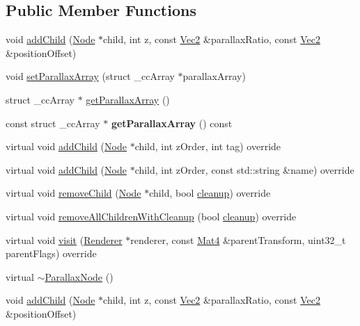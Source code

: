 \subsection*{Public Member Functions}
\begin{DoxyCompactItemize}
\item 
void \hyperlink{classParallaxNode_a6801f18148da7e535e00539086e7661c}{add\+Child} (\hyperlink{classNode}{Node} $\ast$child, int z, const \hyperlink{classVec2}{Vec2} \&parallax\+Ratio, const \hyperlink{classVec2}{Vec2} \&position\+Offset)
\item 
void \hyperlink{classParallaxNode_a6aa28ef360af7ce78e07ef0633da5396}{set\+Parallax\+Array} (struct \+\_\+cc\+Array $\ast$parallax\+Array)
\item 
struct \+\_\+cc\+Array $\ast$ \hyperlink{classParallaxNode_a38cffa76b86e590c2ed9e3b307ea5ee1}{get\+Parallax\+Array} ()
\item 
\mbox{\label{classParallaxNode_a4d3e87281892a340c62aa0df86bc3989}} 
const struct \+\_\+cc\+Array $\ast$ {\bfseries get\+Parallax\+Array} () const
\item 
virtual void \hyperlink{classParallaxNode_ad6094cbe40bd10724b586e136edfed4b}{add\+Child} (\hyperlink{classNode}{Node} $\ast$child, int z\+Order, int tag) override
\item 
virtual void \hyperlink{classParallaxNode_a2ebcf0d5cf1050020272bae8c76641ed}{add\+Child} (\hyperlink{classNode}{Node} $\ast$child, int z\+Order, const std\+::string \&name) override
\item 
virtual void \hyperlink{classParallaxNode_ae7a8f0dc0855dd89ac16bc4bd3f55621}{remove\+Child} (\hyperlink{classNode}{Node} $\ast$child, bool \hyperlink{classNode_aa2de84c6cdeec9cd647d236c30ee0567}{cleanup}) override
\item 
virtual void \hyperlink{classParallaxNode_aa3b4fa198c648421759a8500d2e8d97a}{remove\+All\+Children\+With\+Cleanup} (bool \hyperlink{classNode_aa2de84c6cdeec9cd647d236c30ee0567}{cleanup}) override
\item 
virtual void \hyperlink{classParallaxNode_aee4c2a79089a02e872db670ed07638c1}{visit} (\hyperlink{classRenderer}{Renderer} $\ast$renderer, const \hyperlink{classMat4}{Mat4} \&parent\+Transform, uint32\+\_\+t parent\+Flags) override
\item 
virtual \hyperlink{classParallaxNode_a80996f705ea03234c98efaa769d6197b}{$\sim$\+Parallax\+Node} ()
\item 
void \hyperlink{classParallaxNode_a6801f18148da7e535e00539086e7661c}{add\+Child} (\hyperlink{classNode}{Node} $\ast$child, int z, const \hyperlink{classVec2}{Vec2} \&parallax\+Ratio, const \hyperlink{classVec2}{Vec2} \&position\+Offset)

\end{DoxyCompactItemize}
